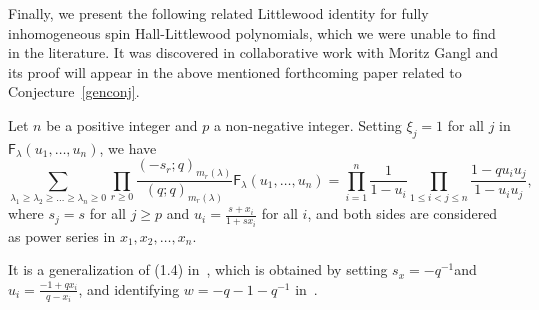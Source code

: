 \documentclass[ALCO, Unicode]{cedram}
\newcommand{\F}{\mathsf{F}}
\begin{document}
	Finally, we present the following related Littlewood identity for fully inhomogeneous spin Hall-Littlewood polynomials, which we were unable to find in the literature. It was discovered in collaborative work with Moritz Gangl and its proof will appear in the above mentioned forthcoming paper related to Conjecture~\ref{genconj}.
	
	\begin{thm} 
		Let $n$ be a positive integer and $p$ a non-negative integer. Setting  
		$\xi_j=1$ for all $j$ in $\F_{\lambda}(u_1,\ldots,u_n)$, we have 
		\[
		\sum_{\lambda_1 \ge \lambda_2 \ge \ldots \ge \lambda_n \ge 0} 
		\prod_{r \ge 0} \frac{(-s_r;q)_{m_r(\lambda)}}{(q;q)_{m_r(\lambda)}} \F_{\lambda}(u_1,\ldots,u_n)   =   
		\prod_{i=1}^{n} \frac{1}{1- u_i}
		\prod_{1 \le i < j \le n} \frac{1-q  u_i u_j}{1-u_i u_j}, 
		\]
		where $s_j=s$ for all $j \ge p$ and $u_i = \frac{s+x_i}{1 + s x_i}$ for all $i$, and both sides are considered as power series in $x_1,x_2,\ldots,x_n$.
	\end{thm} 
	
	It is a generalization of (1.4) in~\cite{Fis22}, which is obtained by setting $s_x=-q^{-1}$and $u_i=\frac{-1+q x_i}{q-x_i}$, and identifying $w=-q-1-q^{-1}$ in~\cite[(1.4)]{Fis22}.
	
	
	
	
	
\end{document}
